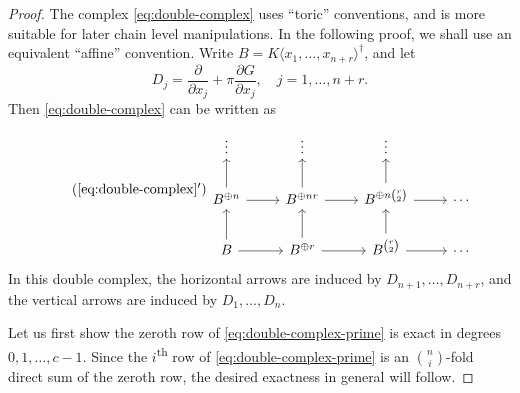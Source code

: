 \documentclass{amsart}
\numberwithin{equation}{section}
\theoremstyle{plain}
\theoremstyle{definition}
\begin{document}
\begin{proof}
The complex \eqref{eq:double-complex} uses ``toric'' conventions, and
is more suitable for later chain level manipulations.  In the
following proof, we shall use an equivalent ``affine'' convention.
Write \(B = K\langle x_{1},\ldots,x_{n+r} \rangle^{\dagger}\), and let
\begin{equation*}
D_{j} = \frac{\partial}{\partial x_{j}} + \pi \frac{\partial G}{\partial x_{j}}, \quad j=1,\ldots,n+r.
\end{equation*}
Then \eqref{eq:double-complex} can be written as
\begin{equation}\tag{\ref*{eq:double-complex}\({}^{\prime}\)}
\label{eq:double-complex-prime}
\begin{tikzcd}
\vdots & \vdots & \vdots \\
B^{\oplus n} \ar{r} \ar{u} & B^{\oplus nr} \ar{u} \ar{r} & B^{\oplus n\binom{r}{2}} \ar{r} \ar{u} & \cdots \\
B \ar{r} \ar{u} & B^{\oplus r} \ar{r} \ar{u} & B^{\binom{r}{2}} \ar{r} \ar{u} & \cdots
\end{tikzcd}
\end{equation}
In this double complex, the horizontal arrows are induced by
\(D_{n+1},\ldots,D_{n+r}\), and the vertical arrows are induced by
\(D_{1},\ldots,D_{n}\).

Let us first show the zeroth row of \eqref{eq:double-complex-prime} is
exact in degrees \(0,1,\ldots,c-1\).  Since the
\(i\)\textsuperscript{th} row of \eqref{eq:double-complex-prime} is an
\(\binom{n}{i}\)-fold direct sum of the zeroth row, the desired
exactness in general will follow.


\end{proof}
\end{document}
